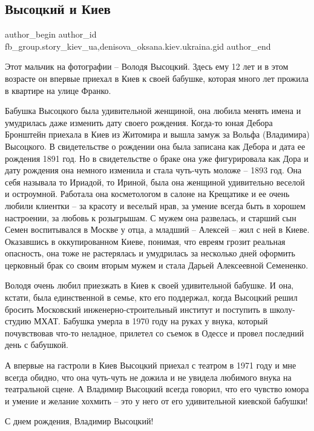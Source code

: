  
 
 
 
 
 
\subsection{Высоцкий и Киев}
\label{sec:25_01_2022.fb.fb_group.story_kiev_ua.1.vysockij_i_kiev}
 
\ifcmt
 author_begin
   author_id fb_group.story_kiev_ua,denisova_oksana.kiev.ukraina.gid
 author_end
\fi

Этот мальчик на фотографии – Володя Высоцкий. Здесь ему 12 лет и в этом
возрасте он впервые приехал в Киев к своей бабушке, которая много лет прожила в
квартире на улице Франко. 

Бабушка Высоцкого была удивительной женщиной, она любила менять имена и
умудрилась даже изменить дату своего рождения. Когда-то юная Дебора Бронштейн
приехала в Киев из Житомира и вышла замуж за Вольфа (Владимира) Высоцкого. В
свидетельстве о рождении она была записана как Дебора и дата ее рождения 1891
год. Но в свидетельстве о браке она уже фигурировала как Дора и дату рождения
она немного изменила и стала чуть-чуть моложе – 1893 год. Она себя называла то
Ириадой, то Ириной, была она женщиной удивительно веселой и остроумной.
Работала она косметологом в салоне на Крещатике и ее очень любили клиентки – за
красоту и веселый нрав, за умение всегда быть в хорошем настроении, за любовь к
розыгрышам. С мужем она развелась, и старший сын Семен воспитывался в Москве у
отца, а младший – Алексей – жил с ней в Киеве. Оказавшись в оккупированном
Киеве, понимая, что евреям грозит реальная опасность, она тоже не растерялась и
умудрилась за несколько дней оформить церковный брак со своим вторым мужем и
стала Дарьей Алексеевной Семененко.

Володя очень любил приезжать в Киев к своей удивительной бабушке. И она,
кстати, была единственной в семье, кто его поддержал, когда Высоцкий решил
бросить Московский инженерно-строительный институт и поступить в школу-студию
МХАТ. Бабушка умерла в 1970 году на руках у внука, который почувствовав что-то
неладное, прилетел со съемок в Одессе и провел последний день с бабушкой.

А впервые на гастроли в Киев Высоцкий приехал с театром в 1971 году и мне
всегда обидно, что она чуть-чуть не дожила и не увидела любимого внука на
театральной сцене. А Владимир Высоцкий всегда говорил, что его чувство юмора и
умение и желание хохмить – это у него от его удивительной киевской бабушки!

С днем рождения, Владимир Высоцкий!
